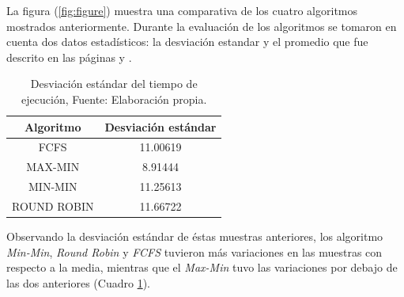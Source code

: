 La figura (\ref{fig:figure}) muestra una comparativa de los cuatro algoritmos mostrados anteriormente. Durante la evaluación de los algoritmos se tomaron en cuenta dos datos estadísticos: la desviación estandar y el promedio que fue descrito en las páginas \pageref{etiqueta} y \pageref{etiqueta2}.


\setcounter{table}{4}
\renewcommand\thetable{\arabic{table}}
\begin{table}[h!]
	\centering
	\begin{tabular}{@{}cc@{}}
		\toprule
		{\bf Algoritmo} & \multicolumn{1}{l}{{\bf Desviaci\'on est\'andar}} \\ \midrule
		FCFS & 11.00619 \\
		MAX-MIN & 8.91444 \\
		MIN-MIN & 11.25613 \\ 
		ROUND ROBIN & 11.66722 \\ \bottomrule
		
	\end{tabular}
	\caption{Desviaci\'on est\'andar del tiempo de ejecuci\'on, Fuente: Elaboraci\'on propia.}
	\label{tiempotabla}
\end{table}

Observando la desviaci\'on est\'andar de \'estas muestras anteriores, los algoritmo \textit{Min-Min}, \textit{Round Robin} y \textit{FCFS} tuvieron m\'as variaciones en las muestras con respecto a la media, mientras que el \textit{Max-Min} tuvo las variaciones por debajo de las dos anteriores (Cuadro \ref{tiempotabla}).